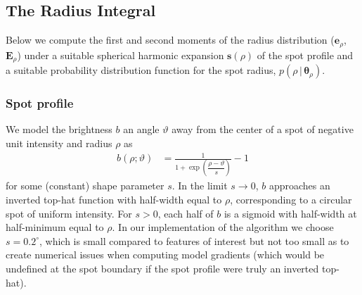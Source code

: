 \documentclass[modern]{aastex62}
\begin{document}
\subsection{The Radius Integral}
\label{sec:size}
%
Below we compute the first and second moments
of the radius distribution ($\mathbf{e}_\rho$, $\mathbf{E}_\rho$) under
a suitable spherical harmonic expansion $\mathbf{s}(\rho)$ of the spot profile
and a suitable probability distribution function for the spot radius,
$p(\rho \, \big| \, \pmb{\theta}_{\rho})$.

\subsubsection{Spot profile}
%
We model the brightness $b$ an angle $\vartheta$ away from the
center of a spot of negative unit intensity and radius $\rho$ as
%
\begin{align}
    \label{eq:brvartheta}
    b(\rho; \vartheta) & = \frac{1}{1 + \exp\left(\dfrac{\rho-\vartheta}{s}\right)} - 1
\end{align}
%
for some (constant) shape parameter $s$. In the limit $s \rightarrow 0$, $b$ approaches an
inverted top-hat function with half-width equal to $\rho$,
corresponding to a circular spot of uniform intensity. For $s > 0$, each half
of $b$ is a sigmoid with half-width at half-minimum equal to $\rho$.
In our implementation of the algorithm we choose $s = 0.2^\circ$,
which is small compared to features of interest but not too small as to
create numerical issues when computing model gradients (which would be
undefined at the spot boundary if the spot profile were truly an inverted top-hat).
\end{document}

